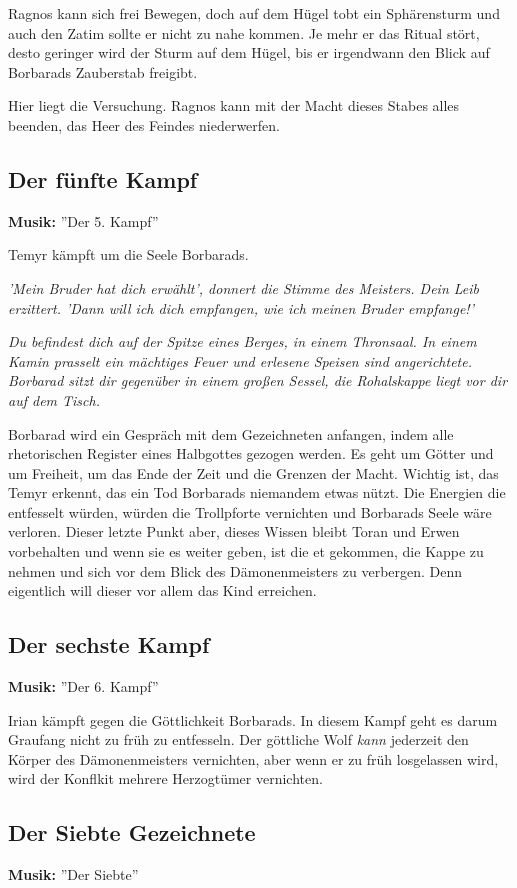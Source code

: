 Ragnos kann sich frei Bewegen, doch auf dem Hügel tobt ein Sphärensturm und auch den Zatim sollte er nicht zu nahe kommen. Je mehr er das Ritual stört, desto geringer wird der Sturm auf dem Hügel, bis er irgendwann den Blick auf Borbarads Zauberstab freigibt. 

Hier liegt die Versuchung. Ragnos kann mit der Macht dieses Stabes alles beenden, das Heer des Feindes niederwerfen. 

\subsection{Der fünfte Kampf}
\textbf{Musik:} ''Der 5. Kampf''

Temyr kämpft um die Seele Borbarads.

\emph{'Mein Bruder hat dich erwählt', donnert die Stimme des Meisters. Dein Leib erzittert. 'Dann will ich dich empfangen, wie ich meinen Bruder empfange!'}

\emph{Du befindest dich auf der Spitze eines Berges, in einem Thronsaal. In einem Kamin prasselt ein mächtiges Feuer und erlesene Speisen sind angerichtete. Borbarad sitzt dir gegenüber in einem großen Sessel, die Rohalskappe liegt vor dir auf dem Tisch.}

Borbarad wird ein Gespräch mit dem Gezeichneten anfangen, indem alle rhetorischen Register eines Halbgottes gezogen werden. Es geht um Götter und um Freiheit, um das Ende der Zeit und die Grenzen der Macht. Wichtig ist, das Temyr erkennt, das ein Tod Borbarads niemandem etwas nützt. Die Energien die entfesselt würden, würden die Trollpforte vernichten und Borbarads Seele wäre verloren. Dieser letzte Punkt aber, dieses Wissen bleibt Toran und Erwen vorbehalten und wenn sie es weiter geben, ist die et gekommen, die Kappe zu nehmen und sich vor dem Blick des Dämonenmeisters zu verbergen. Denn eigentlich will dieser vor allem das Kind erreichen.

\subsection{Der sechste Kampf}
\textbf{Musik:} ''Der 6. Kampf''

Irian kämpft gegen die Göttlichkeit Borbarads.
In diesem Kampf geht es darum Graufang nicht zu früh zu entfesseln.
Der göttliche Wolf \emph{kann} jederzeit den Körper des Dämonenmeisters vernichten, aber wenn er zu früh losgelassen wird, wird der Konflkit mehrere Herzogtümer vernichten.

\subsection{Der Siebte Gezeichnete}
\textbf{Musik:} ''Der Siebte''

